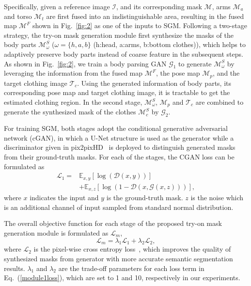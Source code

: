 \documentclass[10pt,twocolumn,letterpaper]{article}
\begin{document}
Specifically, given a reference image $\mathcal{I}$, and its corresponding mask $\mathcal{M}$, arms $\mathcal{M}_{a}$ and torso $\mathcal{M}_{t}$ are first fused into an indistinguishable area, resulting in the fused map $\mathcal{M}^{F}$ shown in Fig.~\ref{fig:2} as one of the inputs to SGM.
Following a two-stage strategy, the try-on mask generation module first synthesize the masks of the body parts $\mathcal{M}^{S}_{\omega}$ ($\omega = \{h, a, b\}$ (h:head, a:arms, b:bottom clothes)), which helps to adaptively preserve body parts instead of coarse feature in the subsequent steps.
As shown in Fig.~\ref{fig:2}, we train a body parsing GAN $\mathcal{G}_{1}$ to generate $\mathcal{M}^{S}_{\omega}$ by leveraging the information from the fused map $\mathcal{M}^{F}$, the pose map $\mathcal{M}_{p}$, and the target clothing  image $\mathcal{T}_{c}$. Using the generated information of body parts, its corresponding pose map and target clothing  image, it is tractable to get the estimated clothing region. In the second stage, $\mathcal{M}^{S}_{\omega}$, $\mathcal{M}_{p}$ and $\mathcal{T}_{c}$ are combined to generate the synthesized mask of the clothes $\mathcal{M}^{S}_{c}$ by $\mathcal{G}_{2}$.




For training SGM, both stages adopt the conditional generative adversarial network (cGAN), in which a U-Net structure is used as the generator while a discriminator given in pix2pixHD~\cite{DBLP:conf/cvpr/Wang0ZTKC18} is deployed to distinguish generated masks from their ground-truth masks.
For each of the stages, the CGAN loss can be formulated as
\begin{equation}
\begin{split}
    \mathcal{L}_{1}=&\mathbb{E}_{x,y}\left[\log\left(\mathcal{D}\left(x,y\right)\right)\right]\\
    &+\mathbb{E}_{x,z}\left[\log\left(1-\mathcal{D}\left(x,\mathcal{G}\left(x,z\right)\right)\right)\right],
\end{split}
\label{GANLOSS}
\end{equation}
where $x$ indicates the input and $y$ is the ground-truth mask. $z$ is the noise which is an additional channel of input sampled from standard normal distribution.

The overall objective function for each stage of the proposed try-on mask generation module is formulated as $\mathcal{L}_{m}$,
\begin{equation}
    \mathcal{L}_{m}=\lambda_{1}  \mathcal{L}_{1}+\lambda_{2} \mathcal{L}_{2},
\label{module1loss}
\end{equation}
where $\mathcal{L}_{2}$ is the pixel-wise cross entropy loss~\cite{goodfellow2016deep}, which improves the quality of synthesized masks from generator with more accurate semantic segmentation results. $\lambda_{1}$ and $\lambda_{2}$ are the trade-off parameters for each loss term in Eq.~(\ref{module1loss}), which are set to 1 and 10, respectively in our experiments.
\end{document}
